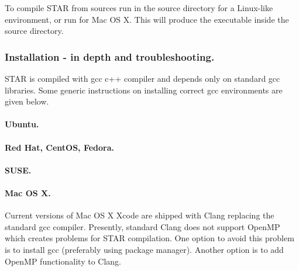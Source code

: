 \documentclass[12pt]{article}
\begin{document}
To compile STAR from sources run  in the source directory for a Linux-like environment, or run  for Mac OS X. This will produce the executable  inside the source directory.

\subsubsection{Installation - in depth and troubleshooting.}
STAR is compiled with gcc c++ compiler and depends only on standard gcc libraries. Some generic instructions on installing correct gcc environments are given below.

\paragraph{Ubuntu.}\hfill
{}

\paragraph{Red Hat, CentOS, Fedora.}\hfill
{}

\paragraph{SUSE.}\hfill
{}

\paragraph{Mac OS X.\newline}
Current versions of Mac OS X Xcode are shipped with Clang replacing the standard gcc compiler. Presently, standard Clang does not support OpenMP which creates problems for STAR compilation. One option to avoid this problem is to install gcc (preferably using  package manager). Another option is to add OpenMP functionality to Clang.
\end{document}
